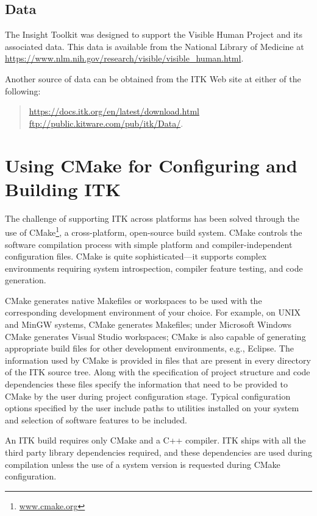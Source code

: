 \subsection{Data}%
\label{sec:Data}

The Insight Toolkit was designed to support the Visible Human Project
and its associated data. This data is available from the National Library of
Medicine at \url{https://www.nlm.nih.gov/research/visible/visible_human.html}.

Another source of data can be obtained from the ITK Web site at either
of the following:
\begin{quote}
\url{https://docs.itk.org/en/latest/download.html} \\
\url{ftp://public.kitware.com/pub/itk/Data/}.
\end{quote}

\section{Using CMake for Configuring and Building ITK}%
\label{sec:UsingCMakeForConfiguringAndBuildingITK}

The challenge of supporting ITK across platforms has been solved through the
use of CMake\footnote{\url{www.cmake.org}}, a cross-platform, open-source build
system. CMake controls the software compilation process with simple platform
and compiler-independent configuration files. CMake is quite sophisticated---it
supports complex environments requiring system introspection, compiler feature
testing, and code generation.

CMake generates native Makefiles or workspaces to be used with the corresponding
development environment of your choice. For example, on UNIX and MinGW systems,
CMake generates Makefiles; under Microsoft Windows CMake generates Visual Studio
workspaces; CMake is also capable of generating appropriate build files for
other development environments, e.g., Eclipse. The information used by CMake is
provided in  files that are present in every directory of
the ITK source tree. Along with the specification of project structure and code
dependencies these files specify the information that need to be provided to
CMake by the user during project configuration stage. Typical configuration
options specified by the user include paths to utilities installed on your
system and selection of software features to be included.

An ITK build requires only CMake and a C++ compiler. ITK ships with all the
third party library dependencies required, and these dependencies are used
during compilation unless the use of a system version is requested during CMake
configuration.

